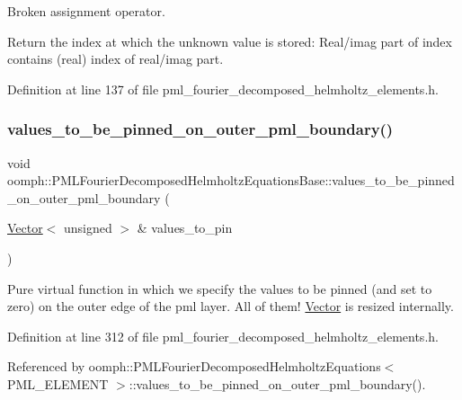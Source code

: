 Broken assignment operator. 

Return the index at which the unknown value is stored\+: Real/imag part of index contains (real) index of real/imag part. 

Definition at line 137 of file pml\+\_\+fourier\+\_\+decomposed\+\_\+helmholtz\+\_\+elements.\+h.

\mbox{\label{classoomph_1_1PMLFourierDecomposedHelmholtzEquationsBase_a5535891a147803a2ba30264b4f772104}} 
\subsubsection{\texorpdfstring{values\+\_\+to\+\_\+be\+\_\+pinned\+\_\+on\+\_\+outer\+\_\+pml\+\_\+boundary()}{values\_to\_be\_pinned\_on\_outer\_pml\_boundary()}}
{\footnotesize\ttfamily void oomph\+::\+P\+M\+L\+Fourier\+Decomposed\+Helmholtz\+Equations\+Base\+::values\+\_\+to\+\_\+be\+\_\+pinned\+\_\+on\+\_\+outer\+\_\+pml\+\_\+boundary (\begin{DoxyParamCaption}\item[{\hyperlink{classoomph_1_1Vector}{Vector}$<$ unsigned $>$ \&}]{values\+\_\+to\+\_\+pin }\end{DoxyParamCaption})\hspace{0.3cm}{\ttfamily [inline]}}



Pure virtual function in which we specify the values to be pinned (and set to zero) on the outer edge of the pml layer. All of them! \hyperlink{classoomph_1_1Vector}{Vector} is resized internally. 



Definition at line 312 of file pml\+\_\+fourier\+\_\+decomposed\+\_\+helmholtz\+\_\+elements.\+h.



Referenced by oomph\+::\+P\+M\+L\+Fourier\+Decomposed\+Helmholtz\+Equations$<$ P\+M\+L\+\_\+\+E\+L\+E\+M\+E\+N\+T $>$\+::values\+\_\+to\+\_\+be\+\_\+pinned\+\_\+on\+\_\+outer\+\_\+pml\+\_\+boundary().



